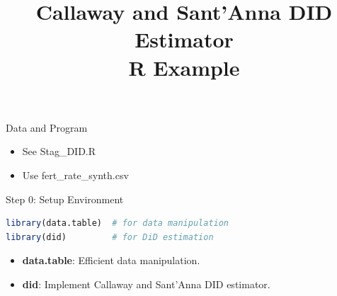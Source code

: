 \documentclass[dvipsnames,hyperref={pdfpagelabels=false}]{beamer}
\begin{document}
\title[]{Callaway and Sant'Anna DID Estimator \\ R Example}

\author{}

\institute{}

\date{}

	
	\begin{frame}
		\titlepage
	\end{frame}

\begin{frame}{Data and Program}{}
	\begin{itemize}
		\item See Stag\_DID.R
		\vspace{0.2cm}
		\item Use fert\_rate\_synth.csv
		
		
	\end{itemize}
\end{frame}


	
	\begin{frame}[fragile]{Step 0: Setup Environment}
\begin{lstlisting}[language=R]
library(data.table)  # for data manipulation
library(did)         # for DiD estimation
\end{lstlisting}
		
		\begin{itemize}
			\item \textbf{data.table}: Efficient data manipulation.
					\vspace{0.2cm}
			\item \textbf{did}: Implement Callaway and Sant'Anna DID estimator.
		\end{itemize}
		
	\end{frame}
	
\end{document}
